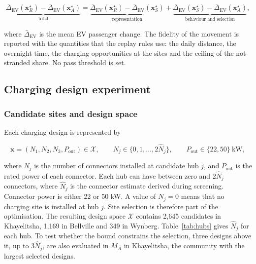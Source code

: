 \documentclass{elsarticle}
\newcommand{\MA}{\ensuremath{M_A}}
\newcommand{\xR}{\ensuremath{\mathbf{x}_R^{\star}}}
\newcommand{\xA}{\ensuremath{\mathbf{x}_A^{\star}}}
\newcommand{\xS}{\ensuremath{\mathbf{x}_S^{\star}}}
\begin{document}
\begin{equation}
    \underbrace{\bar{\Delta}_{\mathrm{EV}}(\xR) - \bar{\Delta}_{\mathrm{EV}}(\xA)}_{\text{total}}
    = \underbrace{\bar{\Delta}_{\mathrm{EV}}(\xR) - \bar{\Delta}_{\mathrm{EV}}(\xS)}_{\text{representation}}
    + \underbrace{\bar{\Delta}_{\mathrm{EV}}(\xS) - \bar{\Delta}_{\mathrm{EV}}(\xA)}_{\text{behaviour and selection}},
\end{equation}

\noindent where \( \bar{\Delta}_{\mathrm{EV}} \) is the mean EV passenger change. The fidelity of the movement is reported with the quantities that the replay rules use: the daily distance, the overnight time, the charging opportunities at the sites and the ceiling of the not-stranded share. No pass threshold is set.


\subsection{Charging design experiment}
\label{sec:experiment}

\subsubsection{Candidate sites and design space}
\label{sec:design_space}

Each charging design is represented by

\begin{equation}
    \mathbf{x} = (N_1, N_2, N_3, P_\mathrm{out}) \in \mathcal{X}, \qquad N_j \in \{0, 1, \ldots, 2\hat{N}_j\}, \qquad P_\mathrm{out} \in \{22, 50\}\ \text{kW},
\end{equation}

\noindent where \(N_j\) is the number of connectors installed at candidate hub \(j\), and \(P_\mathrm{out}\) is the rated power of each connector. Each hub can have between zero and \(2\hat{N}_j\) connectors, where \(\hat{N}_j\) is the connector estimate derived during screening. Connector power is either 22 or 50 kW. A value of \(N_j=0\) means that no charging site is installed at hub \(j\). Site selection is therefore part of the optimisation. The resulting design space \(\mathcal{X}\) contains 2,645 candidates in Khayelitsha, 1,169 in Bellville and 349 in Wynberg. Table~\ref{tab:hubs} gives \(\hat{N}_j\) for each hub. To test whether the bound constrains the selection, three designs above it, up to \(3\hat{N}_j\), are also evaluated in \(\MA\) in Khayelitsha, the community with the largest selected designs.
\end{document}

